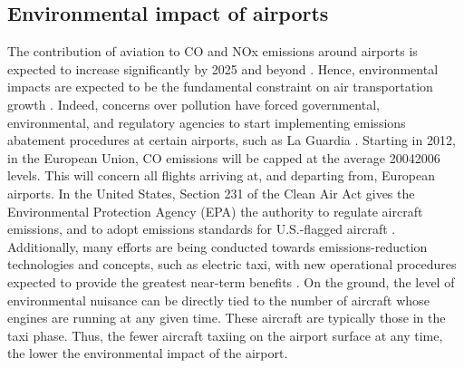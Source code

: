 \documentclass[letterpaper]{article}
\begin{document}
\subsection{Environmental impact of airports}
The contribution of aviation to CO and NOx emissions around airports is expected to increase
 significantly by 2025 and beyond \cite{U.S.1999,Intergovernmental1999}. Hence, environmental impacts
 are expected to be the fundamental constraint on air transportation growth \cite{Waitz2004}.
  Indeed, concerns over pollution have forced governmental, environmental, and regulatory agencies to
   start implementing emissions abatement procedures at certain airports, such as La Guardia \cite{Boeing}.
   Starting in 2012, in the European Union, CO emissions will be capped at the average 20042006 levels.
   This will concern all flights arriving at, and departing from, European airports.
   In the United States, Section 231 of the Clean Air Act gives the Environmental Protection Agency (EPA)
   the authority to regulate aircraft emissions, and to adopt emissions standards for U.S.-flagged aircraft \cite{United2003}.
   Additionally, many efforts are being conducted towards emissions-reduction technologies and concepts, such as electric taxi, with new operational
   procedures expected to provide the greatest near-term benefits \cite{Waitz2004}. On the ground, the level of environmental nuisance can be directly tied to the number of aircraft whose engines are running at any given time. These aircraft are typically those in the taxi phase. Thus, the fewer aircraft taxiing on the airport surface at any time, the lower the environmental impact of the airport.
\end{document}
